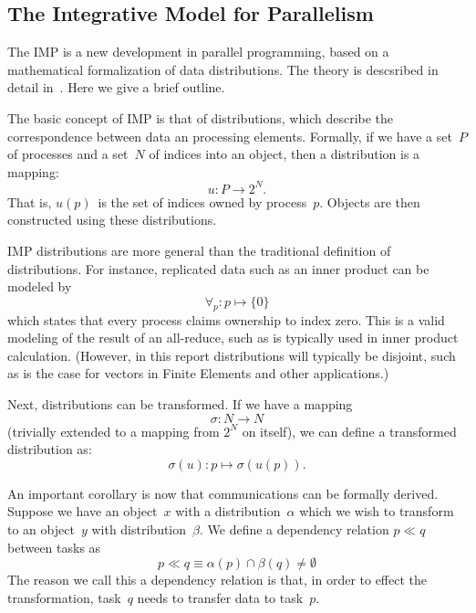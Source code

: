 \documentclass[11pt,fleqn]{article}
\begin{document}
\subsection{The Integrative Model for Parallelism}

The \acf{IMP} is a new development in parallel programming, based on a
mathematical formalization of data distributions. The theory is
descsribed in detail in~\cite{Eijkhout:mathematical2016arxiv}. Here we
give a brief outline.

The basic concept of \ac{IMP} is that of distributions, which describe
the correspondence between data an processing elements.
Formally, if we have a set~$P$ of processes and a set~$N$ of indices
into an object, then a distribution is a mapping:
\begin{equation}
  u\colon P\rightarrow 2^N.
\end{equation}
That is, $u(p)$~is the set of indices owned by process~$p$.
Objects are
then constructed using these distributions.

\ac{IMP} distributions are more general than the traditional
definition of distributions.
For instance, replicated data such as an inner product
can be modeled by
\begin{equation}
  \forall_p\colon p\mapsto\{0\}
\end{equation}
which states that every process claims ownership to index zero.
This is a valid modeling of the result of an all-reduce,
such as is typically used in inner product calculation.
%
(However, in this report distributions will typically be disjoint,
such as is the case for vectors in Finite Elements and other applications.)

Next, distributions can be transformed. If we have a mapping
\[ \sigma\colon N\rightarrow N \]
(trivially extended to a mapping from $2^N$ on itself),
we can define a transformed distribution as:
\begin{equation}
  \sigma(u)\colon p\mapsto \sigma(u(p)).
\end{equation}

An important corollary is now that communications can be formally derived.
Suppose we have an object~$x$ with a distribution~$\alpha$
which we wish to transform to an object~$y$ with distribution~$\beta$.
We define a dependency relation $p\ll q$ between tasks as
\[ p\ll q \equiv \alpha(p)\cap \beta(q)\not=\emptyset \]
The reason we call this a dependency relation is that,
in order to effect the transformation, task~$q$ needs to transfer data
to task~$p$.
\end{document}
